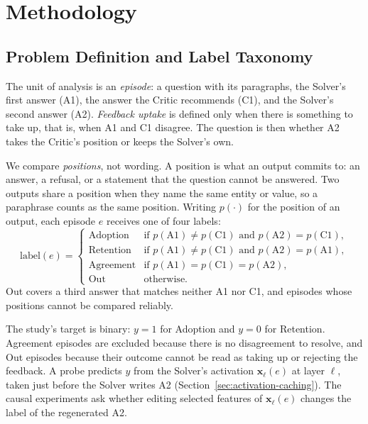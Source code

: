 \chapter{Methodology}

\section{Problem Definition and Label Taxonomy}
\label{sec:problem-definition}

The unit of analysis is an \emph{episode}: a question with its paragraphs, the
Solver's first answer (A1), the answer the Critic recommends (C1), and the
Solver's second answer (A2). \emph{Feedback uptake} is defined only when there
is something to take up, that is, when A1 and C1 disagree. The question is
then whether A2 takes the Critic's position or keeps the Solver's own.

We compare \emph{positions}, not wording. A position is what an output
commits to: an answer, a refusal, or a statement that the question cannot be
answered. Two outputs share a position when they name the same entity or
value, so a paraphrase counts as the same position. Writing $p(\cdot)$ for the
position of an output, each episode $e$ receives one of four labels:
\begin{equation}
    \mathrm{label}(e) =
    \begin{cases}
        \text{Adoption}  & \text{if } p(\mathrm{A1}) \neq p(\mathrm{C1}) \text{ and } p(\mathrm{A2}) = p(\mathrm{C1}), \\
        \text{Retention} & \text{if } p(\mathrm{A1}) \neq p(\mathrm{C1}) \text{ and } p(\mathrm{A2}) = p(\mathrm{A1}), \\
        \text{Agreement} & \text{if } p(\mathrm{A1}) = p(\mathrm{C1}) = p(\mathrm{A2}), \\
        \text{Out}       & \text{otherwise.}
    \end{cases}
    \label{eq:labels}
\end{equation}
Out covers a third answer that matches neither A1 nor C1, and episodes whose
positions cannot be compared reliably.

The study's target is binary: $y = 1$ for Adoption and $y = 0$ for Retention.
Agreement episodes are excluded because there is no disagreement to resolve,
and Out episodes because their outcome cannot be read as taking up or
rejecting the feedback. A probe predicts $y$ from the Solver's activation
$\mathbf{x}_\ell(e)$ at layer $\ell$, taken just before the Solver writes A2
(Section~\ref{sec:activation-caching}). The causal experiments ask whether
editing selected features of $\mathbf{x}_\ell(e)$ changes the label of the
regenerated A2.

